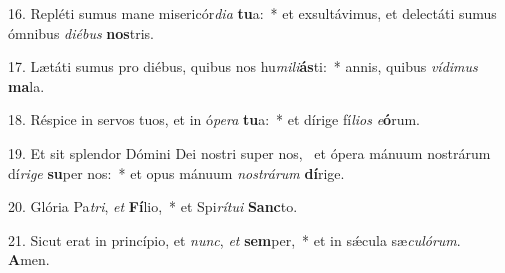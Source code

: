 16. Repléti sumus mane misericór\textit{di}\textit{a} \textbf{tu}a:~*  et exsultávimus, et delectáti sumus ómnibus \textit{di}\textit{é}\textit{bus} \textbf{nos}tris.\

17. Lætáti sumus pro diébus, quibus nos hu\textit{mi}\textit{li}\textbf{ás}ti:~*  annis, quibus \textit{ví}\textit{di}\textit{mus} \textbf{ma}la.\

18. Réspice in servos tuos, et in ó\textit{pe}\textit{ra} \textbf{tu}a:~*  et dírige fí\textit{li}\textit{os} \textit{e}\textbf{ó}rum.\

19. Et sit splendor Dómini Dei nostri super nos, \dag\  et ópera mánuum nostrárum dí\textit{ri}\textit{ge} \textbf{su}per nos:~*  et opus mánuum \textit{nos}\textit{trá}\textit{rum} \textbf{dí}rige.\

20. Glória Pa\textit{tri}, \textit{et} \textbf{Fí}lio,~*  et Spi\textit{rí}\textit{tu}\textit{i} \textbf{Sanc}to.\

21. Sicut erat in princípio, et \textit{nunc}, \textit{et} \textbf{sem}per,~*  et in sǽcula sæ\textit{cu}\textit{ló}\textit{rum}. \textbf{A}men.\

